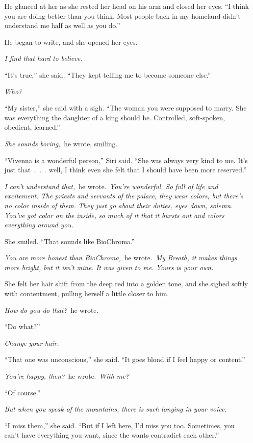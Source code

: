 He glanced at her as she rested her head on his arm and closed her eyes. “I think you are doing better than you think. Most people back in my homeland didn’t understand me half as well as you do.”

He began to write, and she opened her eyes.

\textit{I find that hard to believe.}

“It’s true,” she said. “They kept telling me to become someone else.”

\textit{Who?}

“My sister,” she said with a sigh. “The woman you were supposed to marry. She was everything the daughter of a king should be. Controlled, soft-spoken, obedient, learned.”

\textit{She sounds boring,}~he wrote, smiling.

“Vivenna is a wonderful person,” Siri said. “She was always very kind to me. It’s just that~.~.~. well, I think even she felt that I should have been more reserved.”

\textit{I can’t understand that,}~he wrote.~\textit{You’re wonderful. So full of life and excitement. The priests and servants of the palace, they wear colors, but there’s no color inside of them. They just go about their duties, eyes down, solemn. You’ve got color on the inside, so much of it that it bursts out and colors everything around you.}

She smiled. “That sounds like BioChroma.”

\textit{You are more honest than BioChroma,}~he wrote.~\textit{My Breath, it makes things more bright, but it isn’t mine. It was given to me. Yours is your own.}

She felt her hair shift from the deep red into a golden tone, and she sighed softly with contentment, pulling herself a little closer to him.

\textit{How do you do that?}~he wrote.

“Do what?”

\textit{Change your hair.}

“That one was unconscious,” she said. “It goes blond if I feel happy or content.”

\textit{You’re happy, then?}~he wrote.~\textit{With me?}

“Of course.”

\textit{But when you speak of the mountains, there is such longing in your voice.}

“I miss them,” she said. “But if I left here, I’d miss you too. Sometimes, you can’t have everything you want, since the wants contradict each other.”

